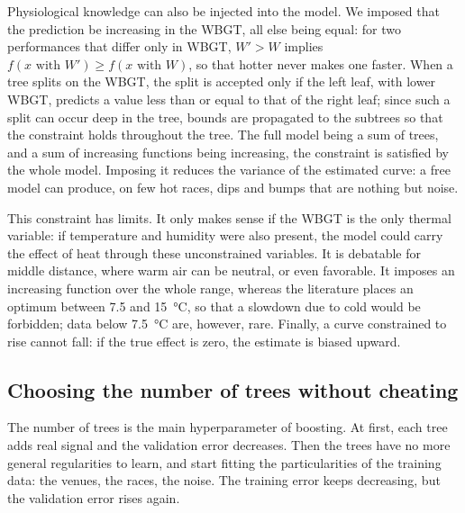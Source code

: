 \documentclass[11pt,a4paper]{article}
\begin{document}
Physiological knowledge can also be injected into the model. We imposed that the prediction be increasing in the
WBGT, all else being equal: for two performances that differ only in WBGT, $W' > W$ implies
$f(x \text{ with } W') \geq f(x \text{ with } W)$, so that hotter never makes one faster. When a tree splits on the
WBGT, the split is accepted only if the left leaf, with lower WBGT, predicts a value less than or equal to that of the
right leaf; since such a split can occur deep in the tree, bounds are propagated to the subtrees so that the
constraint holds throughout the tree. The full model being a sum of trees, and a sum of increasing functions being
increasing, the constraint is satisfied by the whole model. Imposing it reduces the variance of the estimated curve: a
free model can produce, on few hot races, dips and bumps that are nothing but noise.

This constraint has limits. It only makes sense if the WBGT is the only thermal variable: if temperature and humidity
were also present, the model could carry the effect of heat through these unconstrained variables. It is debatable for
middle distance, where warm air can be neutral, or even favorable. It imposes an increasing function over the whole
range, whereas the literature places an optimum between 7.5 and 15~°C, so that a slowdown due to cold would be
forbidden; data below 7.5~°C are, however, rare. Finally, a curve constrained to rise cannot fall: if the true effect is
zero, the estimate is biased upward.

\subsection{Choosing the number of trees without cheating}\label{sec:n_trees}

The number of trees is the main hyperparameter of boosting. At first, each tree adds real signal and the validation
error decreases. Then the trees have no more general regularities to learn, and start fitting the particularities of
the training data: the venues, the races, the noise. The training error keeps decreasing, but the validation error
rises again.
\end{document}

